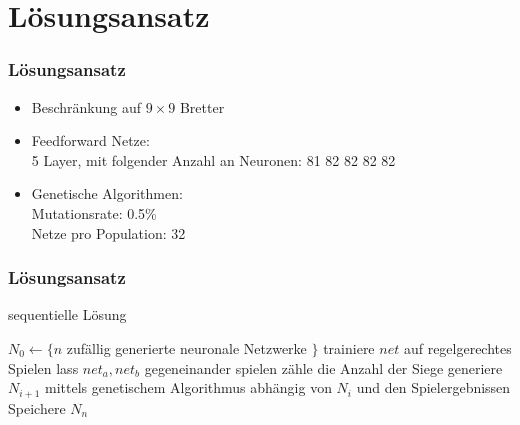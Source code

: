 \section{Lösungsansatz}

\begin{frame}
    \frametitle{Lösungsansatz}

    \begin{itemize}
        \item Beschränkung auf $9 \times 9$ Bretter
        \item Feedforward Netze:\\
            5 Layer, mit folgender Anzahl an Neuronen: 81 82 82 82 82
        \item Genetische Algorithmen:\\
            Mutationsrate: 0.5\%\\
            Netze pro Population: 32\\
    \end{itemize}
\end{frame}

\begin{frame}
    \frametitle{Lösungsansatz}

    \begin{algorithm}[H]
        \caption{sequentielle Lösung}
        \begin{algorithmic}[1]
            \State $N_0 \gets \{ n$ zufällig generierte neuronale Netzwerke $\}$
                \State trainiere $net$ auf regelgerechtes Spielen
            \EndFor
                    \State lass $net_a, net_b$ gegeneinander spielen
                    \State zähle die Anzahl der Siege
                \EndFor
                \State generiere $N_{i+1}$ mittels genetischem Algorithmus
                abhängig von $N_i$ und den Spielergebnissen
            \EndFor
            \State Speichere $N_n$
        \end{algorithmic}
    \end{algorithm}
\end{frame}

